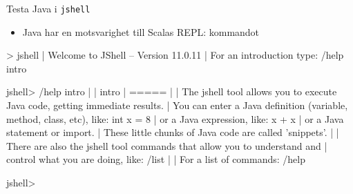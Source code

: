 \begin{Slide}{Testa Java i \texttt{jshell}}
\begin{itemize}\SlideFontSmall
  \item Java har en motsvarighet till Scalas REPL: kommandot 
\end{itemize}
\begin{REPLsmall}
> jshell
|  Welcome to JShell -- Version 11.0.11
|  For an introduction type: /help intro

jshell> /help intro
|  
|                                   intro
|                                   =====
|  
|  The jshell tool allows you to execute Java code, getting immediate results.
|  You can enter a Java definition (variable, method, class, etc), like:  int x = 8
|  or a Java expression, like:  x + x
|  or a Java statement or import.
|  These little chunks of Java code are called 'snippets'.
|  
|  There are also the jshell tool commands that allow you to understand and
|  control what you are doing, like:  /list
|  
|  For a list of commands: /help

jshell> 
\end{REPLsmall}
\end{Slide}

